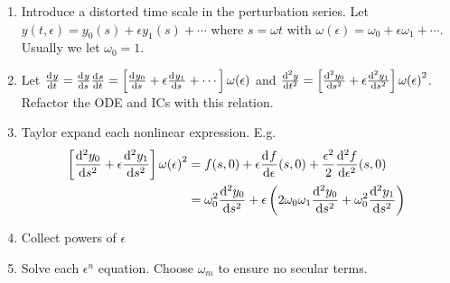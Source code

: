 \item[Poincar\'e-Lindstedt Method] \hfill
  \begin{enumerate}
  \item Introduce a distorted time scale in the perturbation series. Let
    $y(t,\epsilon)=y_0(s) + \epsilon y_1(s) + \cdots$ where $s=\omega t$ with
    $\omega(\epsilon) = \omega_0 + \epsilon\omega_1 + \cdots$. Usually we let
    $\omega_0=1$.
  \item Let $\od{y}{t}=\od{y}{s}\od{s}{t}=\left[\od{y_0}{s} +
      \epsilon\od{y_1}{s} + \cdots\right] \omega(\epsilon)$ and
    $\od[2]{y}{t}=\left[\od[2]{y_0}{s} +
      \epsilon\od[2]{y_1}{s}\right]{\omega(\epsilon)}^2$. Refactor the ODE and
    ICs with this relation.
  \item Taylor expand each nonlinear expression. E.g.
    \begin{align*}
      \left[ \od[2]{y_0}{s}+\epsilon\od[2]{y_1}{s} \right]{\omega(\epsilon)}^2
      &= f(s,0)+\epsilon\od{f}{\epsilon}(s,0) +
        \frac{\epsilon^2}{2}\od[2]{f}{\epsilon}(s,0) \\
      &= \omega_0^2 \od[2]{y_0}{s} + \epsilon\left(2\omega_0\omega_1\od[2]{y_0}{s} +
        \omega_0^2\od[2]{y_1}{s}\right) \
    \end{align*}
  \item Collect powers of $\epsilon$
  \item Solve each $\epsilon^n$ equation. Choose $\omega_m$ to ensure no secular
    terms.
  \end{enumerate}
